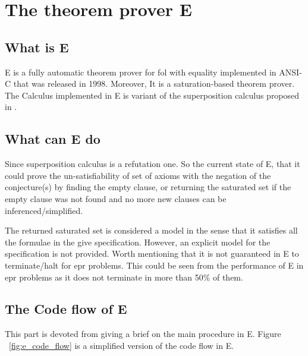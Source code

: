 \section{The theorem prover E} \label{sec:c2s3}
\subsection{What is E}
E is a fully automatic theorem prover for \ac{fol} with equality implemented in ANSI-C that was released in 1998. Moreover, It is a saturation-based theorem prover. The Calculus implemented in E is variant of the superposition calculus proposed in \cite{BAGA94}.


\subsection{What can E do}
Since superposition calculus is a refutation one. So the current state of E, that it could prove the un-satisfiability of set of axioms with the negation of the conjecture(s) by finding the empty clause, or returning the saturated set if the empty clause was not found and no more new clauses can be inferenced/simplified. 


The returned saturated set is considered a model in the sense that it satisfies all the formulae in the give specification. However, an explicit model for the specification is not provided. Worth mentioning that it is not guaranteed in E to terminate/halt for \ac{epr} problems. This could be seen from the performance of E in \ac{epr} problems as it does not terminate in more than 50\% of them. 



\subsection{The Code flow of E}
This part is devoted from giving a brief on the main procedure in E. Figure ~\ref{fig:e_code_flow} is a simplified version of the code flow in E.

